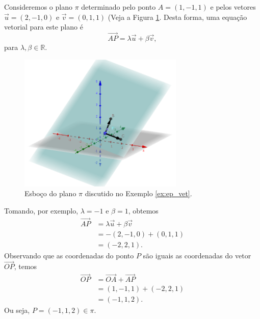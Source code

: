 \begin{ex}\label{ex:ep_vet}
  Consideremos o plano $\pi$ determinado pelo ponto $A = (1,-1,1)$ e pelos vetores $\vec{u} = (2,-1,0)$ e $\vec{v} = (0,1,1)$ (Veja a Figura \ref{fig:ex_ep_vet}. Desta forma, uma equação vetorial para este plano é
  \begin{equation}
    \overrightarrow{AP} = \lambda\vec{u}+\beta\vec{v},
  \end{equation}
  para $\lambda,\beta\in\mathbb{R}$.
  
  \begin{figure}[H]
    \centering
    \includegraphics[width=0.7\textwidth]{./cap_erp/dados/fig_ex_ep_vet/fig_ex_ep_vet}
    \caption{Esboço do plano $\pi$ discutido no Exemplo \ref{ex:ep_vet}.}
    \label{fig:ex_ep_vet}
  \end{figure}
  
  Tomando, por exemplo, $\lambda = -1$ e $\beta = 1$, obtemos
  \begin{align}
    \overrightarrow{AP} &= \lambda\vec{u}+\beta\vec{v}\\
                        &= -(2,-1,0) + (0,1,1)\\
                        &= (-2,2,1).
  \end{align}
  Observando que as coordenadas do ponto $P$ são iguais as coordenadas do vetor $\overrightarrow{OP}$, temos
  \begin{align}
    \overrightarrow{OP} &= \overrightarrow{OA}+\overrightarrow{AP}\\
                        &= (1,-1,1)+(-2,2,1)\\
                        &= (-1,1,2).
  \end{align}
  Ou seja, $P = (-1,1,2)\in\pi$.
\end{ex}

